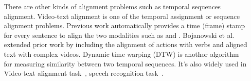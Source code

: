 There are other kinds of alignment problems such as temporal sequences alignment. Video-text alignment is one of the temporal assignment or sequence alignment problems. Previous work automatically provides a time (frame) stamp for every sentence to align the two modalities such as \cite{bojanowski2015weakly} and \cite{dogan2018neural}. Bojanowski et al.~ extended prior work by including the alignment of actions with verbs and aligned text with complex videos. Dynamic time warping (DTW) is anothor algorithm for measuring similarity between two temporal sequences. It's also widely used in Video-text alignment task~\cite{dogan2018neural}, speech recognition task~\cite{vintsyuk1968speech}.%





